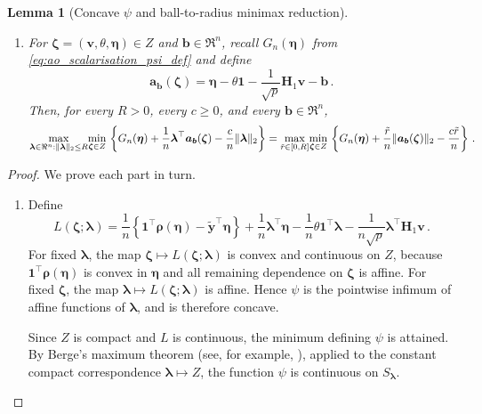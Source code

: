 \documentclass{article}
\makeatletter
\newtheorem{lemma}{Lemma}
\theoremstyle{definition}
\newcommand{\vnorm}[1]{%
	\ensuremath{%
		\if@display
		\left\| #1 \right\|
		\else
		\| #1 \|
		\fi
	}%
}
\newcommand*{\bb}{\boldsymbol}
\def\bH {\bb{H}}
\def\bv{\bb{v}}
\def\bYtil{\widetilde{\bb{y}}}
\def\bH{\bb{H}}
\def\blambda{\bb{\lambda}}
\makeatother
\begin{document}
\begin{bibunit}
\begin{lemma}[Concave $\psi$ and ball-to-radius minimax reduction]
\begin{enumerate}[label=(\roman*),ref=\thelemma(\roman*)]
		\item \label{lemma:psi_conv_conc_ball_to_radius} For
		$\bb\zeta=(\bv,\theta,\bb\eta)\in Z$ and $\bb b\in\Re^n$, recall $G_n(\bb\eta)$ from \eqref{eq:ao_scalarisation_psi_def} and define
		\begin{equation}
			\label{eq:psi_conv_conc_ell_A_def}
			\bb a_{\bb b}(\bb\zeta)
			=
			\bb\eta
			-
			\theta\bb 1
			-
			\frac{1}{\sqrt p}
			\bH_1\bv
			-
			\bb b \,.
		\end{equation}
		Then, for every $R>0$, every $c\geq0$, and every $\bb b\in\Re^n$,
		\begin{equation}
			\label{eq:psi_conv_conc_ball_to_radius}
			\begin{aligned}
			\underset{\blambda\in\Re^n:\vnorm{\blambda}_2\leq R}{\max}
				\underset{\bb\zeta\in Z}{\min} \,
				\left\{
					G_n(\bb\eta)
					+
					\frac{1}{n}
					\blambda^\top
					\bb a_{\bb b}(\bb\zeta)
					-
					\frac{c}{n}
					\vnorm{\blambda}_2
				\right\} 
				=
				\underset{\tilde r\in[0,R]}{\max}
				\underset{\bb\zeta\in Z}{\min} \,
				\left\{
					G_n(\bb\eta)
					+
					\frac{\tilde r}{n}
					\vnorm{
						\bb a_{\bb b}(\bb\zeta)
					}_2
					-
					\frac{c\tilde r}{n}
				\right\} \,.
			\end{aligned}
		\end{equation}
	\end{enumerate}
\end{lemma}

\begin{proof}
We prove each part in turn. 
\begin{enumerate}[label=(\roman*)]
\item	Define
	\begin{equation}
		\label{eq:psi_conv_conc_L_def}
		L(\bb\zeta;\blambda)
		=
		\frac{1}{n}
		\left\{
			\bb 1^\top\bb\rho(\bb\eta)
			-
			\bYtil^\top\bb\eta
		\right\}
		+
		\frac{1}{n}
		\blambda^\top\bb\eta
		-
		\frac{1}{n}
		\theta\bb 1^\top\blambda
		-
		\frac{1}{n\sqrt p}
		\blambda^\top\bH_1\bv \,.
	\end{equation}
	For fixed $\blambda$, the map $\bb\zeta\mapsto L(\bb\zeta;\blambda)$ is
	convex and continuous on $Z$, because $\bb 1^\top\bb\rho(\bb\eta)$
	is convex in $\bb\eta$ and all remaining dependence on $\bb\zeta$ is
	affine. For fixed $\bb\zeta$, the map
	$\blambda\mapsto L(\bb\zeta;\blambda)$ is affine. Hence $\psi$ is the
	pointwise infimum of affine functions of $\blambda$, and is therefore
	concave.

	Since $Z$ is compact and $L$ is continuous, the minimum defining
	$\psi$ is attained. By Berge's maximum theorem (see, for example,
	\citealt[][Theorem~17.31.1]{aliprantis+et+al:2006}), applied to the
	constant compact correspondence $\blambda\mapsto Z$,
	the function $\psi$ is continuous on $S_{\blambda}$.


\end{enumerate}
\end{proof}
\end{bibunit}
\end{document}
